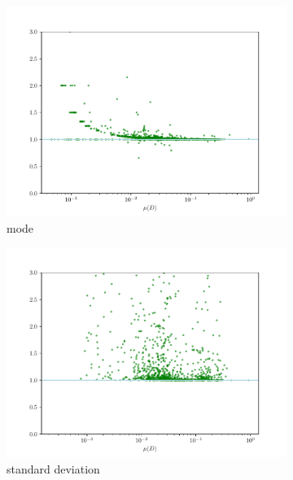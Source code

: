 \documentclass[12pt,a4paper,automark, toc=bib]{scrreprt}
\theoremstyle{definition}
\begin{document}
\begin{figure}
\begin{subfigure}{0.32\linewidth}
			\includegraphics[width=\linewidth]{figures/stat_sha384_0mode_div.pdf}
			\caption{mode}
		\end{subfigure}
		\begin{subfigure}{0.32\linewidth}
			\includegraphics[width=\linewidth]{figures/stat_sha384_0std_div.pdf}
			\caption{standard deviation}
		\end{subfigure}
		\begin{subfigure}{0.32\linewidth}

\end{subfigure}
\end{figure}
\end{document}
